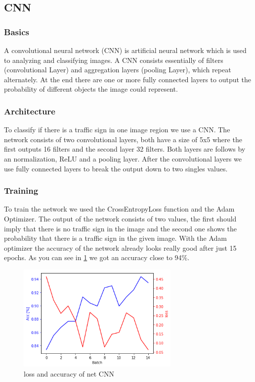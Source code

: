 \documentclass[12pt,a4paper,bibliography=totocnumbered,listof=totocnumbered]{scrartcl}
\begin{document}
\subsection{CNN}

\subsubsection{Basics}
A convolutional neural network (CNN) is artificial neural network which is used to analyzing and classifying images. A CNN consists essentially of filters (convolutional Layer) and aggregation layers (pooling Layer), which repeat alternately. At the end there are one or more fully connected layers to output the probability of different objects the image could represent.

\subsubsection{Architecture}
To classify if there is a traffic sign in one image region we use a CNN. The network consists of two convolutional layers, both have a size of 5x5 where the first outputs 16 filters and the second layer 32 filters. Both layers are follows by an normalization, ReLU and a pooling layer. After the convolutional layers we use fully connected layers to break the output down to two singles values. 

\subsubsection{Training}
To train the network we used the CrossEntropyLoss function and the Adam Optimizer. The output of the network consists of two values, the first should imply that there is no traffic sign in the image and the second one shows the probability that there is a traffic sign in the given image. With the Adam optimizer the accuracy of the network already looks really good after just 15 epochs. As you can see in \ref{fig:loss_acc} we got an accuracy close to 94\%.

\begin{figure}[htbp] 
  \centering
     \includegraphics[width=0.7\textwidth]{loss_acc}
  \caption{loss and accuracy of net CNN}
  \label{fig:loss_acc}
\end{figure}
\end{document}
